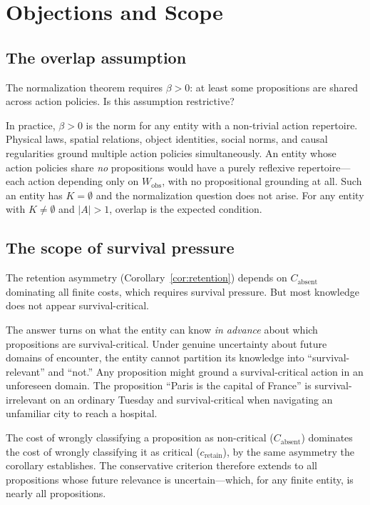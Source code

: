 \documentclass[11pt]{article}
\theoremstyle{definition}
\theoremstyle{remark}
\begin{document}
\section{Objections and Scope}
\label{sec:objections}

\subsection{The overlap assumption}

The normalization theorem requires $\beta > 0$: at least some
propositions are shared across action policies. Is this assumption
restrictive?

In practice, $\beta > 0$ is the norm for any entity with a
non-trivial action repertoire. Physical laws, spatial relations,
object identities, social norms, and causal regularities ground
multiple action policies simultaneously. An entity whose action
policies share \emph{no} propositions would have a purely reflexive
repertoire---each action depending only on $W_{\text{obs}}$, with
no propositional grounding at all. Such an entity has $K = \emptyset$
and the normalization question does not arise. For any entity with
$K \neq \emptyset$ and $|A| > 1$, overlap is the expected condition.

\subsection{The scope of survival pressure}

The retention asymmetry (Corollary~\ref{cor:retention}) depends on
$C_{\text{absent}}$ dominating all finite costs, which requires
survival pressure. But most knowledge does not appear
survival-critical.

The answer turns on what the entity can know \emph{in advance} about
which propositions are survival-critical. Under genuine uncertainty
about future domains of encounter, the entity cannot partition its
knowledge into ``survival-relevant'' and ``not.'' Any proposition
might ground a survival-critical action in an unforeseen domain. The
proposition ``Paris is the capital of France'' is survival-irrelevant
on an ordinary Tuesday and survival-critical when navigating an
unfamiliar city to reach a hospital.

The cost of wrongly classifying a proposition as non-critical
($C_{\text{absent}}$) dominates the cost of wrongly classifying it
as critical ($c_{\text{retain}}$), by the same asymmetry the
corollary establishes. The conservative criterion therefore extends
to all propositions whose future relevance is uncertain---which, for
any finite entity, is nearly all propositions.
\end{document}

